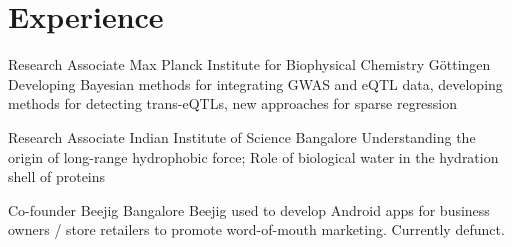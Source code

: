 \section{Experience}
        {Research Associate}
        {Max Planck Institute for Biophysical Chemistry}
        {G\"ottingen}
        {}
        {Developing Bayesian methods for integrating GWAS and eQTL data, developing methods for detecting trans-eQTLs, new approaches for sparse regression}

        {Research Associate}
        {Indian Institute of Science}
        {Bangalore}
        {}
        {Understanding the origin of long-range hydrophobic force; Role of biological water in the hydration shell of proteins}


        {Co-founder}
        {Beejig}
        {Bangalore}
        {}
        {Beejig used to develop Android apps for business owners / store retailers to promote word-of-mouth marketing. Currently defunct.}

